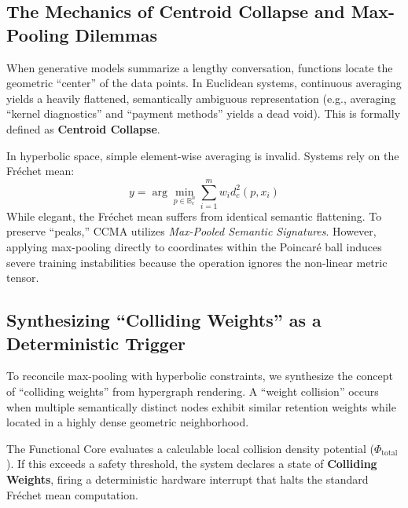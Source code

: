 \documentclass[11pt, a4paper]{article}
\begin{document}
	\subsection{The Mechanics of Centroid Collapse and Max-Pooling Dilemmas}
    When generative models summarize a lengthy conversation, functions locate the geometric ``center'' of the data points. In Euclidean systems, continuous averaging yields a heavily flattened, semantically ambiguous representation (e.g., averaging ``kernel diagnostics'' and ``payment methods'' yields a dead void). This is formally defined as \textbf{Centroid Collapse}.
    
    In hyperbolic space, simple element-wise averaging is invalid. Systems rely on the Fréchet mean:
    \begin{equation}
        y = \arg\min_{p\in\mathbb{B}_c^n} \sum_{i=1}^{m} w_i d_c^2(p, x_i)
    \end{equation}
    While elegant, the Fréchet mean suffers from identical semantic flattening. To preserve ``peaks,'' CCMA utilizes \textit{Max-Pooled Semantic Signatures}. However, applying max-pooling directly to coordinates within the Poincaré ball induces severe training instabilities because the operation ignores the non-linear metric tensor.
    
    \subsection{Synthesizing ``Colliding Weights'' as a Deterministic Trigger}
    To reconcile max-pooling with hyperbolic constraints, we synthesize the concept of ``colliding weights'' from hypergraph rendering. A ``weight collision'' occurs when multiple semantically distinct nodes exhibit similar retention weights while located in a highly dense geometric neighborhood.

    The Functional Core evaluates a calculable local collision density potential ($\Phi_{\text{total}}$). If this exceeds a safety threshold, the system declares a state of \textbf{Colliding Weights}, firing a deterministic hardware interrupt that halts the standard Fréchet mean computation.
\end{document}
